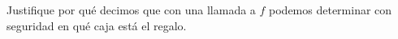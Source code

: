 \documentclass[./../main.tex]{subfiles}
\begin{document}

\section{}

Justifique por qué decimos que con una llamada a \(f\) podemos determinar con seguridad en qué caja está el regalo.
\end{document}
